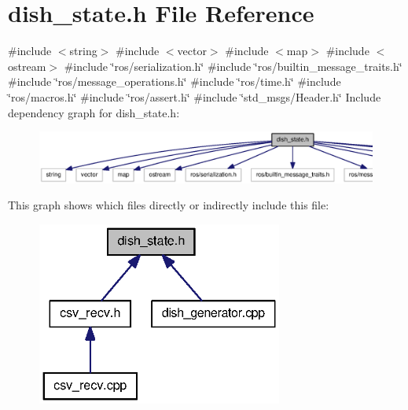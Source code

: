 \section{dish\-\_\-state.\-h \-File \-Reference}
\label{dish__state_8h}
{\ttfamily \#include $<$string$>$}\*
{\ttfamily \#include $<$vector$>$}\*
{\ttfamily \#include $<$map$>$}\*
{\ttfamily \#include $<$ostream$>$}\*
{\ttfamily \#include \char`\"{}ros/serialization.\-h\char`\"{}}\*
{\ttfamily \#include \char`\"{}ros/builtin\-\_\-message\-\_\-traits.\-h\char`\"{}}\*
{\ttfamily \#include \char`\"{}ros/message\-\_\-operations.\-h\char`\"{}}\*
{\ttfamily \#include \char`\"{}ros/time.\-h\char`\"{}}\*
{\ttfamily \#include \char`\"{}ros/macros.\-h\char`\"{}}\*
{\ttfamily \#include \char`\"{}ros/assert.\-h\char`\"{}}\*
{\ttfamily \#include \char`\"{}std\-\_\-msgs/\-Header.\-h\char`\"{}}\*
\-Include dependency graph for dish\-\_\-state.\-h\-:\nopagebreak
\begin{figure}[H]
\begin{center}
\leavevmode
\includegraphics[width=350pt]{dish__state_8h__incl}
\end{center}
\end{figure}
\-This graph shows which files directly or indirectly include this file\-:\nopagebreak
\begin{figure}[H]
\begin{center}
\leavevmode
\includegraphics[width=229pt]{dish__state_8h__dep__incl}
\end{center}
\end{figure}
